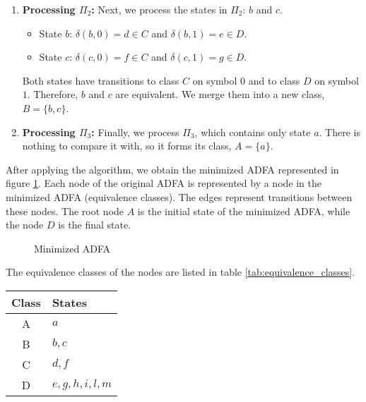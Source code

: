 \begin{example}
\begin{enumerate}
        \item \textbf{Processing $\Pi_2$:} Next, we process the states in $\Pi_2$: $b$ and $c$.
        \begin{itemize}
            \item State $b$: $\delta(b, 0) = d \in C$ and $\delta(b, 1) = e \in D$.
            \item State $c$: $\delta(c, 0) = f \in C$ and $\delta(c, 1) = g \in D$.
        \end{itemize}
        Both states have transitions to class $C$ on symbol $0$ and to class $D$ on symbol $1$. Therefore, $b$ and $c$ are equivalent. We merge them into a new class, $B = \{b, c\}$.

        \item \textbf{Processing $\Pi_3$:} Finally, we process $\Pi_3$, which contains only state $a$. There is nothing to compare it with, so it forms its class, $A = \{a\}$.
    \end{enumerate}

    After applying the algorithm, we obtain the minimized ADFA represented in figure \cref{fig:example_minimized_ADFA}. Each node of the original ADFA is represented by a node in the minimized ADFA (equivalence classes). The edges represent transitions between these nodes. The root node $A$ is the initial state of the minimized ADFA, while the node $D$ is the final state.
    \begin{figure}[H]
        \centering
        \caption{Minimized ADFA}
        \label{fig:example_minimized_ADFA}
    \end{figure}      

    The equivalence classes of the nodes are listed in table \cref{tab:equivalence_classes}.
    \begin{center}
        \begin{tabular}{|c|l|}
        \hline
        \textbf{Class} & \textbf{States} \\
        \hline
        A & $a$ \\
        B & $b, c$ \\
        C & $d, f$ \\
        D & $e, g, h, i, l, m$ \\
        \hline
        \end{tabular}
        \label{tab:equivalence_classes}
    \end{center}
\end{example}
